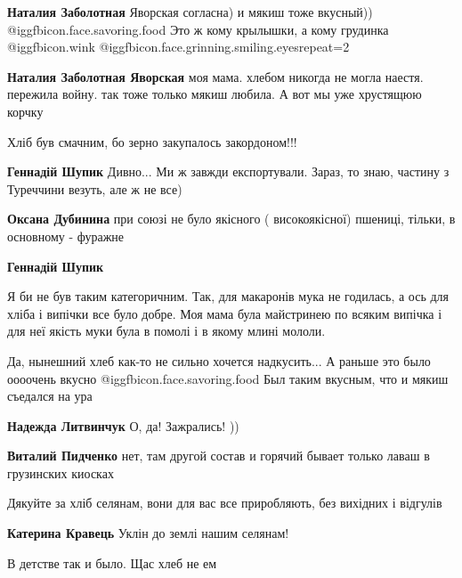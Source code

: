 \begin{itemize}
\begin{itemize} %
\textbf{Наталия Заболотная} Яворская согласна) и мякиш тоже вкусный)) @igg{fbicon.face.savoring.food}  Это ж кому крылышки, а кому грудинка @igg{fbicon.wink}  @igg{fbicon.face.grinning.smiling.eyes}{repeat=2} 

\textbf{Наталия Заболотная Яворская} моя мама. хлебом никогда не могла наестя. пережила войну. так тоже только мякиш любила.
А вот мы уже хрустящюю корчку
\end{itemize} %

Хліб був смачним, бо зерно закупалось закордоном!!!

\begin{itemize} %
\textbf{Геннадій Шупик}
Дивно... Ми ж завжди експортували.
Зараз, то знаю, частину з Туреччини везуть, але ж не все)

\textbf{Оксана Дубинина} при союзі не було якісного ( високоякісної) пшениці, тільки, в основному - фуражне

\textbf{Геннадій Шупик} 

Я би не був таким категоричним. Так, для макаронів мука не годилась, а ось для
хліба і випічки все було добре. Моя мама була майстринею по всяким випічка і
для неї якість муки була в помолі і в якому млині мололи.

\end{itemize} %


Да, нынешний хлеб как-то не сильно хочется надкусить... А раньше это было
оооочень вкусно @igg{fbicon.face.savoring.food} Был таким вкусным, что и
мякиш съедался на ура

\begin{itemize} %
\textbf{Надежда Литвинчук}
О, да! Зажрались! ))

\textbf{Виталий Пидченко} нет, там другой состав и горячий бывает только лаваш в грузинских киосках
\end{itemize} %

Дякуйте за хліб селянам, вони для вас все приробляють, без вихідних і відгулів

\textbf{Катерина Кравець}
Уклін до землі нашим селянам!

В детстве так и было. Щас хлеб не ем


\end{itemize}
